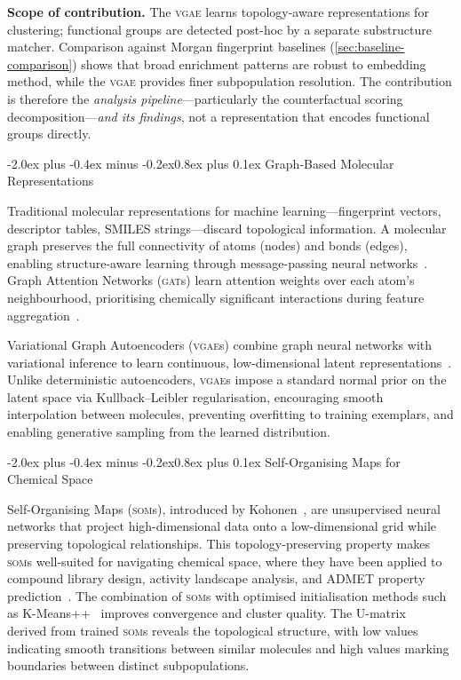 \documentclass[10pt,a4paper,twocolumn]{article}
\makeatletter
\newcommand{\vgae}{\textsc{vgae}}
\newcommand{\gat}{\textsc{gat}}
\newcommand{\som}{\textsc{som}}
\renewcommand\subsection{\@startsection{subsection}{2}{\z@}%
  {-2.0ex plus -0.4ex minus -0.2ex}{0.8ex plus 0.1ex}%
  {\normalfont\large\bfseries}}
\makeatother
\begin{document}
\textbf{Scope of contribution.} The \vgae{} learns topology-aware representations for clustering; functional groups are detected post-hoc by a separate substructure matcher. Comparison against Morgan fingerprint baselines (\cref{sec:baseline-comparison}) shows that broad enrichment patterns are robust to embedding method, while the \vgae{} provides finer subpopulation resolution. The contribution is therefore the \emph{analysis pipeline}---particularly the counterfactual scoring decomposition---\emph{and its findings}, not a representation that encodes functional groups directly.

\subsection{Graph-Based Molecular Representations}

Traditional molecular representations for machine learning---fingerprint vectors, descriptor tables, SMILES strings---discard topological information. A molecular graph preserves the full connectivity of atoms (nodes) and bonds (edges), enabling structure-aware learning through message-passing neural networks~\cite{david2020,guo2023}. Graph Attention Networks (\gat{}s) learn attention weights over each atom's neighbourhood, prioritising chemically significant interactions during feature aggregation~\cite{velickovic2018}.

Variational Graph Autoencoders (\vgae{}s) combine graph neural networks with variational inference to learn continuous, low-dimensional latent representations~\cite{kipf2016}. Unlike deterministic autoencoders, \vgae{}s impose a standard normal prior on the latent space via Kullback--Leibler regularisation, encouraging smooth interpolation between molecules, preventing overfitting to training exemplars, and enabling generative sampling from the learned distribution.

\subsection{Self-Organising Maps for Chemical Space}

Self-Organising Maps (\som{}s), introduced by Kohonen~\cite{kohonen1990}, are unsupervised neural networks that project high-dimensional data onto a low-dimensional grid while preserving topological relationships. This topology-preserving property makes \som{}s well-suited for navigating chemical space, where they have been applied to compound library design, activity landscape analysis, and ADMET property prediction~\cite{kohonen2007,chaudhary2014,kotyrba2021}. The combination of \som{}s with optimised initialisation methods such as K-Means++~\cite{bahmani2012} improves convergence and cluster quality. The U-matrix~\cite{ultsch1993} derived from trained \som{}s reveals the topological structure, with low values indicating smooth transitions between similar molecules and high values marking boundaries between distinct subpopulations.
\end{document}
